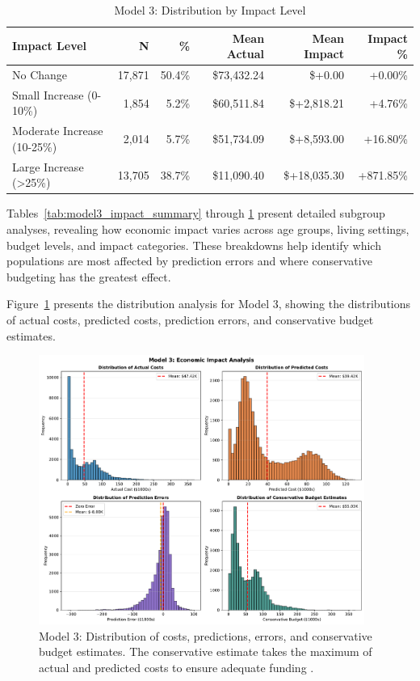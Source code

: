 \begin{table}[htbp]
\centering
\small
\caption{Model 3: Distribution by Impact Level \FiscalYear}
\label{tab:model3_impact_distribution}
\begin{tabular}{lrrrrr}
\toprule
\textbf{Impact Level} & \textbf{N} & \textbf{\%} & \textbf{Mean Actual} & \textbf{Mean Impact} & \textbf{Impact \%} \\
\midrule
No Change & 17,871 & 50.4\% & \$73,432.24 & \$+0.00 & +0.00\% \\
Small Increase (0-10\%) & 1,854 & 5.2\% & \$60,511.84 & \$+2,818.21 & +4.76\% \\
Moderate Increase (10-25\%) & 2,014 & 5.7\% & \$51,734.09 & \$+8,593.00 & +16.80\% \\
Large Increase (>25\%) & 13,705 & 38.7\% & \$11,090.40 & \$+18,035.30 & +871.85\% \\
\bottomrule
\end{tabular}
\end{table}

Tables~\ref{tab:model3_impact_summary} through \ref{tab:model3_impact_distribution} present detailed subgroup analyses, revealing how economic impact varies across age groups, living settings, budget levels, and impact categories. These breakdowns help identify which populations are most affected by prediction errors and where conservative budgeting has the greatest effect.

Figure~\ref{fig:model3_impact_histograms} presents the distribution analysis for Model 3, showing the distributions of actual costs, predicted costs, prediction errors, and conservative budget estimates.

\begin{figure}[htbp]
\centering
\includegraphics[width=0.95\textwidth]{figures/model_3_Impact_Histograms.pdf}
\caption{Model 3: Distribution of costs, predictions, errors, and conservative budget estimates. The conservative estimate takes the maximum of actual and predicted costs to ensure adequate funding \FiscalYear.}
\label{fig:model3_impact_histograms}
\end{figure}

